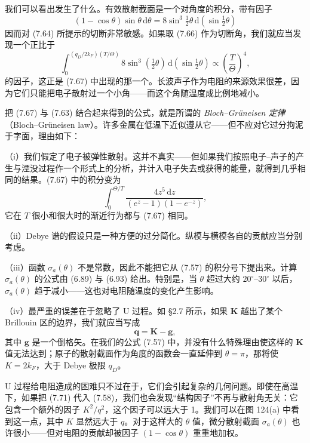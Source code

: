 我们可以看出发生了什么。有效散射截面是一个对角度的积分，带有因子
\begin{equation*}
(1-\cos\theta)\sin\theta\,\mathrm{d}\theta=8\sin^{3}\tfrac{1}{2}\theta\,\mathrm{d}(\sin\tfrac{1}{2}\theta)\tag{7.69}
\end{equation*}
因而对 (7.64) 所提示的切断非常敏感。如果取 (7.66) 作为切断角，我们就应当发现一个正比于
\begin{equation*}
\int_{0}^{(q_{D}/2k_{F})(T/\Theta)}8\sin^{3}(\tfrac{1}{2}\theta)\,\mathrm{d}(\sin\tfrac{1}{2}\theta)\propto\left(\frac{T}{\Theta}\right)^{4},\tag{7.70}
\end{equation*}
的因子，这正是 (7.67) 中出现的那一个。长波声子作为电阻的来源效果很差，因为它们只能把电子散射过一个小角——而这个角随温度成比例地减小。

把 (7.67) 与 (7.63) 结合起来得到的公式，就是所谓的 \emph{Bloch--Grüneisen 定律}（Bloch--Grüneisen law）。许多金属在低温下近似遵从它——但不应对它过分拘泥于字面，理由如下：

（i）我们假定了电子被弹性散射。这并不真实——但如果我们按照电子--声子的产生与湮没过程作一个形式上的分析，并计入电子失去或获得的能量，就得到几乎相同的结果。(7.67) 中的积分变为
\begin{equation*}
\int_{0}^{\Theta/T}\frac{4z^{5}\,\mathrm{d}z}{(e^{z}-1)(1-e^{-z})},
\end{equation*}
它在 $T$ 很小和很大时的渐近行为都与 (7.67) 相同。

（ii）Debye 谱的假设只是一种方便的过分简化。纵模与横模各自的贡献应当分别考虑。

（iii）函数 $\sigma_{a}(\theta)$ 不是常数，因此不能把它从 (7.57) 的积分号下提出来。计算 $\sigma_{a}(\theta)$ 的公式由 (6.89) 与 (6.93) 给出。特别是，当 $\theta$ 超过大约 $20^{\circ}$--$30^{\circ}$ 以后，$\sigma_{a}(\theta)$ 趋于减小——这也对电阻随温度的变化产生影响。

（iv）最严重的误差在于忽略了 U 过程。如 §2.7 所示，如果 $\mathbf{K}$ 越出了某个 Brillouin 区的边界，我们就应当写成
\begin{equation*}
\mathbf{q}=\mathbf{K}-\mathbf{g},\tag{7.71}
\end{equation*}
其中 $\mathbf{g}$ 是一个倒格矢。在我们的公式 (7.57) 中，并没有什么特殊理由使这样的 $\mathbf{K}$ 值无法达到；原子的散射截面作为角度的函数会一直延伸到 $\theta=\pi$，那将使 $K=2k_{F}$，大于 Debye 极限 $q_{D}$。

U 过程给电阻造成的困难只不过在于，它们会引起复杂的几何问题。即使在高温下，如果把 (7.71) 代入 (7.58)，我们也会发现“结构因子”不再与散射角无关：它包含一个额外的因子 $K^{2}/q^{2}$，这个因子可以远大于 1。我们可以在图 124(a) 中看到这一点，其中 $K$ 显然远大于 $q$。对于这样大的 $\theta$ 值，微分散射截面 $\sigma_{a}(\theta)$ 也许很小——但对电阻的贡献却被因子 $(1-\cos\theta)$ 重重地加权。

